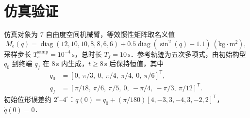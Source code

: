 \documentclass[12pt,a4paper]{article}
\theoremstyle{definition}
\theoremstyle{remark}
\newcommand{\sign}{\operatorname{sign}}
\newcommand{\sat}{\operatorname{sat}}
\newcommand{\diag}{\operatorname{diag}}
\newcommand{\vi}{\upsilon}
\newcommand{\vth}{\vartheta}
\newcommand{\T}{\mathsf{T}}
\begin{document}






\section{仿真验证}


仿真对象为 $7$ 自由度空间机械臂，等效惯性矩阵取名义值
\[
  M_e(q)=\diag(12,10,10,8,8,6,6)+0.5\diag(\sin^2(q)+1.1)\ (\text{kg}\cdot\text{m}^2),
\]
采样步长 $T_s^{\text{samp}}=10^{-4}\,\text{s}$，总时长 $T_f=10\,\text{s}$．参考轨迹为五次多项式，由初始构型 $q_0$ 到终端 $q_f$ 在 $8\,\text{s}$ 内生成，$t\ge 8\,\text{s}$ 后保持恒值，其中
\[
\begin{aligned}
q_0&=[0,\ \pi/3,\ 0,\ \pi/4,\ \pi/4,\ 0,\ \pi/6]^\T,\\
q_f&=[\pi/18,\ \pi/6,\ \pi/5,\ 0,\ -\pi/4,\ -\pi/3,\ \pi/12]^\T .
\end{aligned}
\]
初始位形误差约 $2^\circ$--$4^\circ$：$q(0)=q_0+(\pi/180)[4,-3,3,-4,3,-2,2]^\T$，$\dot q(0)=0$．
\end{document}
